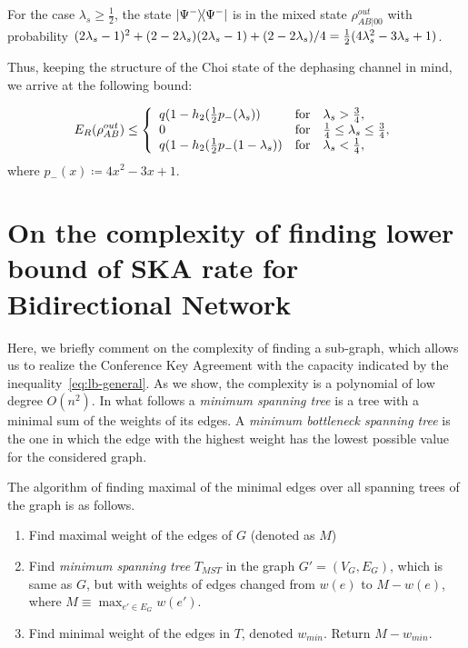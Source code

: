 \documentclass[aps,pra,twocolumn,superscriptaddress,longbibliography]{revtex4-1}
\begin{document}
\begin{appendix}
For the case $\lambda_s\geq \frac{1}{2}$, the state $\op{\Psi^-}$ is 
in the mixed state $\rho^{out}_{AB|00}$  with probability $(2\lambda_s-1)^2 + (2-2\lambda_s)(2\lambda_s-1) +(2-2\lambda_s)/4={1\over 2}(4\lambda_s^2-3\lambda_s +1)$.

Thus, keeping the structure of the Choi state of the dephasing channel in mind, we arrive at the following bound:

\begin{equation}
    E_R(\rho^{out}_{AB})\leq
\left\{
\begin{array}{ll}
q(1- h_2({1\over 2}p_-(\lambda_s)) & \textnormal{for}\quad \lambda_s > \frac{3}{4},\\
0 & \textnormal{for}\quad \frac{1}{4}\leq \lambda_s\leq \frac{3}{4},\\
q(1- h_2({1\over 2}p_-(1-\lambda_s)) & \textnormal{for}\quad \lambda_s< \frac{1}{4},\\
\end{array}
\right.
\end{equation}
where $p_-(x)\coloneqq 4x^2-3x +1$.

\section{On the complexity of finding lower bound of SKA rate for Bidirectional Network}\label{app:complexity}


Here, we briefly comment on the complexity of finding a sub-graph, which allows us to realize the Conference Key Agreement with the capacity indicated by the inequality~\eqref{eq:lb-general}. 
As we show, the complexity is a polynomial
of low degree $O(n^2)$. In what 
follows a {\it minimum spanning tree} is
 a tree with a minimal sum of the weights
 of its edges. A {\it minimum bottleneck
 spanning tree} is the one in which the
 edge with the highest weight has the lowest possible value for the considered graph.

The algorithm of finding maximal of
the minimal edges over all spanning 
trees of the graph is as follows.
\begin{enumerate}[label={(\arabic*)}]
\item Find maximal weight
of the edges of $G$ (denoted as $M$)
\item Find
{\it minimum spanning tree} $T_{MST}$ in the graph $G'=(V_G,E_G)$, which is same as $G$, but with weights of edges changed from
$w(e)$ to $M-w(e)$, where $M\equiv \max_{e'\in E_G} w(e')$.
\item Find minimal
weight of the edges in $T$, denoted $w_{min}$. Return $M-w_{min}$.
\end{enumerate}


\end{appendix}
\end{document}
